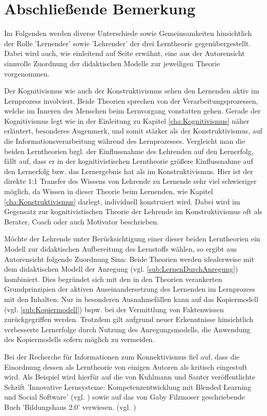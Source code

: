 \chapter{Abschließende Bemerkung}
\label{cha:Schluss}
Im Folgenden werden diverse Unterschiede sowie Gemeinsamkeiten hinsichtlich der Rolle 'Lernender' sowie 'Lehrender' der drei Lerntheorie gegenübergestellt. Dabei wird auch, wie einleitend auf Seite \pageref{cha:Einleitung} erwähnt, eine aus der Autorensicht sinnvolle Zuordnung der didaktischen Modelle zur jeweiligen Theorie vorgenommen. 

Der Kognitivismus wie auch der Konstruktivismus sehen den Lernenden aktiv im Lernprozess involviert. Beide Theorien sprechen von der Verarbeitungsprozessen, welche im Inneren des Menschen beim Lernvorgang vonstatten gehen. Gerade der Kognitivismus legt wie in der Einleitung zu Kapitel \ref{cha:Kognitivismus} näher erläutert, besonderes Augenmerk, und somit stärker als der Konstruktivismus, auf die Informationsverarbeitung während des Lernprozesses. Vergleicht man die beiden Lerntheorien bzgl. der Einflussnahme des Lehrenden auf den Lernerfolg, fällt auf, dass er in der kognitivistischen Lerntheorie größere Einflussnahme auf den Lernerfolg bzw. das Lernergebnis hat als im Konstruktivismus. Hier ist der direkte 1:1 Transfer des Wissens von Lehrende zu Lernende sehr viel schwieriger möglich, da Wissen in dieser Theorie beim Lernenden, wie Kapitel \ref{cha:Konstruktivismus} darlegt, individuell konstruiert wird. Dabei wird im Gegensatz zur kognitivistischen Theorie der Lehrende im Konstruktivismus oft als Berater, Coach oder auch Motivator beschrieben. \cite[S. 30ff.]{Bohm.2006} %

Möchte der Lehrende unter Berücksichtigung einer dieser beiden Lerntheorien ein Modell zur didaktischen Aufbereitung des Lernstoffs wählen, so ergibt aus Autorensicht folgende Zuordnung Sinn: Beide Theorien werden idealerweise mit dem didaktischen Modell der Anregung (vgl. \ref{sub:LernenDurchAnregung}) kombiniert. Dies begründet sich mit den in den Theorien verankerten Grundprinzipien der aktiven Auseinandersetzung des Lernenden im Lernprozess mit den Inhalten. Nur in besonderen Ausnahmefällen kann auf das Kopiermodell (vgl. \ref{sub:Kopiermodell}) bspw. bei der Vermittlung von Faktenwissen zurückgegriffen werden. Trotzdem gilt aufgrund neuer Erkenntnisse hinsichtlich verbesserte Lernerfolge durch Nutzung des Anregungsmodells, die Anwendung des Kopiermodells sofern möglich zu vermeiden.

Bei der Recherche für Informationen zum Konnektivismus fiel auf, dass die Einordnung dessen als Lerntheorie von einigen Autoren als kritisch eingestuft wird. Als Beispiel wird hierfür auf die von Kuhlmann und Sauter veröffentlichte Schrift 'Innovative Lernsysteme: Kompetenzentwicklung mit Blended Learning und Social Software' (vgl. \cite{Kuhlmann.2008}) sowie auf das von Gaby Filzmoser geschriebende Buch 'Bildungshaus 2.0' verwiesen. (vgl. \cite{Filzmoser.2013})

